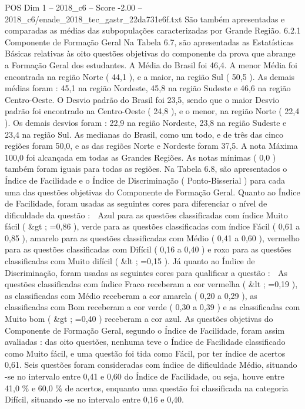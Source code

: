 \begin{textsample}{POS Dim 1 – 2018\_c6 – Score -2.00 – 2018\_c6/enade\_2018\_tec\_gastr\_22da731e6f.txt}
São também apresentadas e comparadas as médias das subpopulações caracterizadas por Grande Região. 6.2.1 Componente de Formação Geral Na Tabela 6.7, são apresentadas as Estatísticas Básicas relativas às oito questões objetivas do componente da prova que abrange a Formação Geral dos estudantes.
A Média do Brasil foi 46,4.
A menor Média foi encontrada na região Norte ( 44,1 ), e a maior, na região Sul ( 50,5 ).
As demais médias foram : 45,1 na região Nordeste, 45,8 na região Sudeste e 46,6 na região Centro-Oeste.
O Desvio padrão do Brasil foi 23,5, sendo que o maior Desvio padrão foi encontrado na Centro-Oeste ( 24,8 ), e o menor, na região Norte ( 22,4 ).
Os demais desvios foram : 22,9 na região Nordeste, 23,8 na região Sudeste e 23,4 na região Sul.
As medianas do Brasil, como um todo, e de três das cinco regiões foram 50,0, e as das regiões Norte e Nordeste foram 37,5.
A nota Máxima 100,0 foi alcançada em todas as Grandes Regiões.
As notas mínimas ( 0,0 ) também foram iguais para todas as regiões.
Na Tabela 6.8, são apresentados o Índice de Facilidade e o Índice de Discriminação ( Ponto-Bisserial ) para cada uma das questões objetivas do Componente de Formação Geral.
Quanto ao Índice de Facilidade, foram usadas as seguintes cores para diferenciar o nível de dificuldade da questão :  Azul para as questões classificadas com índice Muito fácil ( \&gt ; =0,86 ), verde para as questões classificadas com índice Fácil ( 0,61 a 0,85 ), amarelo para as questões classificadas com Médio ( 0,41 a 0,60 ), vermelho para as questões classificadas com Difícil ( 0,16 a 0,40 ) e roxo para as questões classificadas com Muito difícil ( \&lt ; =0,15 ).
Já quanto ao Índice de Discriminação, foram usadas as seguintes cores para qualificar a questão :  As questões classificadas com índice Fraco receberam a cor vermelha ( \&lt ; =0,19 ), as classificadas com Médio receberam a cor amarela ( 0,20 a 0,29 ), as classificadas com Bom receberam a cor verde ( 0,30 a 0,39 ) e as classificadas com Muito bom ( \&gt ; =0,40 ) receberam a cor azul.
As questões objetivas do Componente de Formação Geral, segundo o Índice de Facilidade, foram assim avaliadas : das oito questões, nenhuma teve o Índice de Facilidade classificado como Muito fácil, e uma questão foi tida como Fácil, por ter índice de acertos 0,61.
Seis questões foram consideradas com índice de dificuldade Médio, situando -se no intervalo entre 0,41 e 0,60 do Índice de Facilidade, ou seja, houve entre 41,0 \% e 60,0 \% de acertos, enquanto uma questão foi classificada na categoria Difícil, situando -se no intervalo entre 0,16 e 0,40.

\end{textsample}
